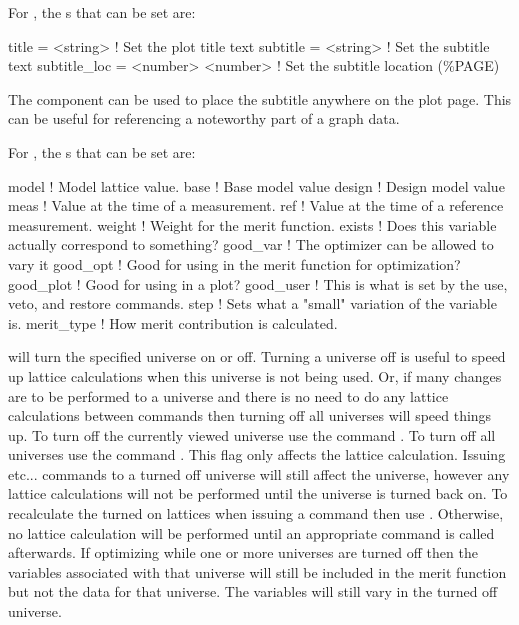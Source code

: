 For , the s that can be set are:
\begin{example}
  title        = <string>          ! Set the plot title text
  subtitle     = <string>          ! Set the subtitle text
  subtitle_loc = <number> <number> ! Set the subtitle location (\%PAGE)
\end{example}
The  component can be used to place the subtitle anywhere on
the plot page. This can be useful for referencing a noteworthy part of a graph
data.
\vskip 0.2in

For , the s that can be set are:
\begin{example}
  model       ! Model lattice value.
  base        ! Base model value
  design      ! Design model value
  meas        ! Value at the time of a measurement.
  ref         ! Value at the time of a reference measurement.
  weight      ! Weight for the merit function.
  exists      ! Does this variable actually correspond to something?
  good_var    ! The optimizer can be allowed to vary it
  good_opt    ! Good for using in the merit function for optimization?
  good_plot   ! Good for using in a plot?
  good_user   ! This is what is set by the use, veto, and restore commands.
  step        ! Sets what a "small" variation of the variable is.
  merit_type  ! How merit contribution is calculated.
\end{example}
\vskip 0.2in

 will turn the specified universe on or off. Turning
a universe off is useful to speed up lattice calculations when this
universe is not being used. Or, if many changes are to be performed to
a universe and there is no need to do any lattice calculations between
commands then turning off all universes will speed things up. To turn off 
the currently viewed universe use the command . 
To turn off all universes use the command . 
This flag only affects the lattice calculation. 
Issuing  etc...  commands to a turned off universe
will still affect the
universe, however any lattice calculations will not be performed until
the universe is turned back on.  To recalculate the turned on lattices
when issuing a  command then use . Otherwise, no lattice calculation will
be performed until an appropriate command is called afterwards.  If
optimizing while one or more universes are turned off then the
variables associated with that universe will still be included in the
merit function but not the data for that universe. The variables will
still vary in the turned off universe.

